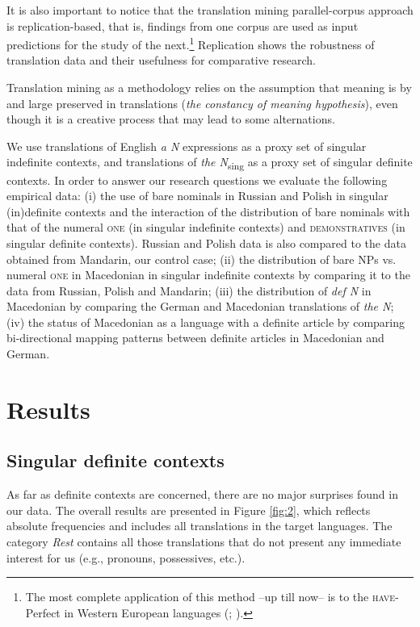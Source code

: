 \documentclass[output=paper,colorlinks,citecolor=brown]{langscibook}
\begin{document}
It is also important to notice that the translation mining parallel-corpus approach is replication-based, that is, findings from one corpus are used as input predictions for the study of the next.\footnote{The most complete application of this method --up till now-- is to the \textsc{have}-Perfect in Western European languages (\citealt{vanderKlis.et.al.2022}; \citealt{LeBruyn.deSwart2022}).} Replication shows the robustness of translation data and their usefulness for comparative research. 

Translation mining as a methodology relies on the assumption that meaning is by and large preserved in translations (\textit{the constancy of meaning hypothesis}), even though it is a creative process that may lead to some alternations. 

We use translations of English \textit{a N} expressions as a proxy set of singular indefinite contexts, and translations of \textit{the N}\textsubscript{sing} as a proxy set of singular definite contexts. In order to answer our research questions we evaluate the following empirical data: (i) the use of bare nominals in Russian and Polish in singular (in)definite contexts and the interaction of the distribution of bare nominals with that of the numeral \textsc{one} (in singular indefinite contexts) and \textsc{demonstratives} (in singular definite contexts). Russian and Polish data is also compared to the data obtained from Mandarin, our control case;
(ii) the distribution of bare NPs vs. numeral \textsc{one} in Macedonian in singular indefinite contexts by comparing it to the data from Russian, Polish and Mandarin; (iii) the distribution of \textit{def N} in Macedonian by comparing the German and Macedonian translations of \textit{the N}; (iv) the status of Macedonian as a language with a definite article by comparing bi-directional mapping patterns between definite articles in Macedonian and German.
\fi


\section{Results} \label{results}

\subsection{Singular definite contexts}
 As far as definite contexts are concerned, there are no major surprises found in our data. The overall results are presented in Figure \ref{fig:2}, which reflects absolute frequencies and includes all translations in the target languages. The category \textit{Rest} contains all those translations that do not present any immediate interest for us (e.g., pronouns, possessives, etc.).  
 
\end{document}
